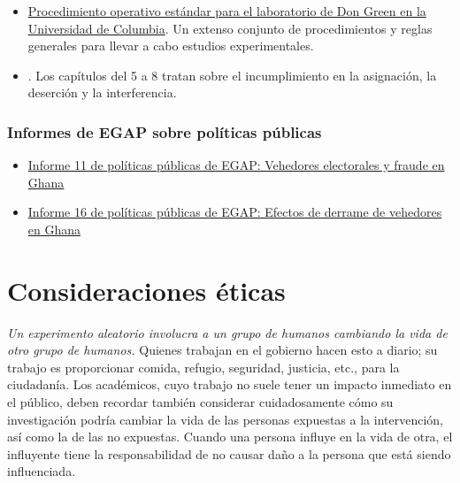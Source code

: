 \documentclass[12pt,spanish,]{book}
\providecommand{\tightlist}{%
  \setlength{\itemsep}{0pt}\setlength{\parskip}{0pt}}
\begin{document}
\begin{itemize}
\tightlist
\item
  \href{https://github.com/acoppock/Green-Lab-SOP}{Procedimiento operativo estándar para el laboratorio de Don Green en la Universidad de Columbia}. Un extenso conjunto de procedimientos y reglas generales para llevar a cabo estudios experimentales.
\item
  \autocite{gerber_field_2012}. Los capítulos del 5 a 8 tratan sobre el incumplimiento en la asignación, la deserción y la interferencia.
\end{itemize}

\hypertarget{informes-de-egap-sobre-poluxedticas-puxfablicas-3}{%
\subsection{Informes de EGAP sobre políticas públicas}\label{informes-de-egap-sobre-poluxedticas-puxfablicas-3}}

\begin{itemize}
\item
  \href{https://egap.org/resource/brief-11-election-observers-and-fraud-in-ghana/}{Informe 11 de políticas públicas de EGAP: Vehedores electorales y fraude en Ghana}
\item
  \href{https://egap.org/resource/brief-16-spillover-effects-of-observers-in-ghana/}{Informe 16 de políticas públicas de EGAP: Efectos de derrame de vehedores en Ghana}
\end{itemize}

\hypertarget{consideraciones-uxe9ticas}{%
\chapter{Consideraciones éticas}\label{consideraciones-uxe9ticas}}

\emph{Un experimento aleatorio involucra a un grupo de humanos cambiando la vida de otro grupo de humanos.} Quienes trabajan en el gobierno hacen esto a diario; su trabajo es proporcionar comida, refugio, seguridad, justicia, etc., para la ciudadanía. Los académicos, cuyo trabajo no suele tener un impacto inmediato en el público, deben recordar también considerar cuidadosamente cómo su investigación podría cambiar la vida de las personas expuestas a la intervención, así como la de las no expuestas. Cuando una persona influye en la vida de otra, el influyente tiene la responsabilidad de no causar daño a la persona que está siendo influenciada.
\end{document}
